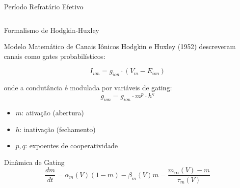 \begin{frame}{Período Refratário Efetivo}
\begin{columns}
\begin{center}
\end{center}
\end{columns}

\vspace{0.3cm}

\end{frame}

\begin{frame}{Formalismo de Hodgkin-Huxley}
\begin{block}{Modelo Matemático de Canais Iônicos}
Hodgkin e Huxley (1952) descreveram canais como gates probabilísticos:

\begin{equation*}
I_{ion} = g_{ion} \cdot (V_m - E_{ion})
\end{equation*}

onde a condutância é modulada por variáveis de gating:
\begin{equation*}
g_{ion} = \bar{g}_{ion} \cdot m^p \cdot h^q
\end{equation*}

\begin{itemize}
    \item $m$: ativação (abertura)
    \item $h$: inativação (fechamento)
    \item $p, q$: expoentes de cooperatividade
\end{itemize}
\end{block}

\vspace{0.3cm}

\begin{exampleblock}{Dinâmica de Gating}
\begin{equation*}
\frac{dm}{dt} = \alpha_m(V)(1-m) - \beta_m(V)m = \frac{m_\infty(V) - m}{\tau_m(V)}
\end{equation*}
\end{exampleblock}
\end{frame}

